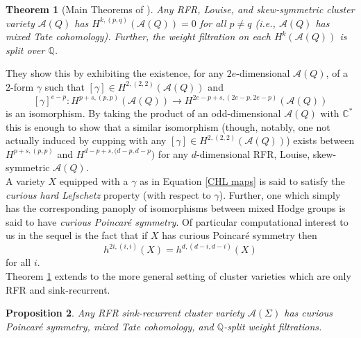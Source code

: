 \documentclass[11pt]{amsart}
\newtheorem{thm}{Theorem}[section]
\newtheorem{prop}[thm]{Proposition}
\theoremstyle{definition}
\theoremstyle{remark}
\numberwithin{equation}{section}
\begin{document}
\begin{thm}[Main Theorems of \cite{lam2022cohomology}]\label{louise CHL}
    Any RFR, Louise, and skew-symmetric cluster variety $\mathcal{A}(Q)$ has $H^{k, (p, q)}(\mathcal{A}(Q)) = 0$ for all $p \neq q$ (i.e., $\mathcal{A}(Q)$ has mixed Tate cohomology). Further, the weight filtration on each $H^k(\mathcal{A}(Q))$ is split over $\mathbb{Q}$.
\end{thm}

They show this by exhibiting the existence, for any $2e$-dimensional $\mathcal{A}(Q)$, of a $2$-form $\gamma$ such that $[\gamma] \in H^{2, (2,2)}(\mathcal{A}(Q))$ and \begin{equation}\label{CHL maps}
    [\gamma]^{e - p}:H^{p + s, (p, p)}(\mathcal{A}(Q)) \rightarrow H^{2e - p + s, (2e - p, 2e - p)}(\mathcal{A}(Q))
\end{equation}
\noindent is an isomorphism. By taking the product of an odd-dimensional $\mathcal{A}(Q)$ with $\mathbb{C}^*$ this is enough to show that a similar isomorphism (though, notably, one not actually induced by cupping with any $[\gamma] \in H^{2, (2, 2)}(\mathcal{A}(Q))$) exists between $H^{p + s, (p, p)}$ and $H^{d - p + s, (d - p, d - p})$ for any $d$-dimensional RFR, Louise, skew-symmetric $\mathcal{A}(Q)$.\\

A variety $X$ equipped with a $\gamma$ as in Equation \ref{CHL maps} is said to satisfy the \textit{curious hard Lefschetz} property (with respect to $\gamma$). Further, one which simply has the corresponding panoply of isomorphisms between mixed Hodge groups is said to have \textit{curious Poincar\'e symmetry}. Of particular computational interest to us in the sequel is the fact that if $X$ has curious Poincar\'e symmetry then $$h^{2i, (i, i)}(X) = h^{d, (d-i, d-i)}(X)$$ \noindent for all $i$.\\

Theorem \ref{louise CHL} extends to the more general setting of cluster varieties which are only RFR and sink-recurrent.

\begin{prop}\label{sink-recurrent CHL}
     Any RFR sink-recurrent cluster variety $\mathcal{A}(\Sigma)$ has curious Poincar\'e symmetry, mixed Tate cohomology, and $\mathbb{Q}$-split weight filtrations.
\end{prop}
\end{document}
